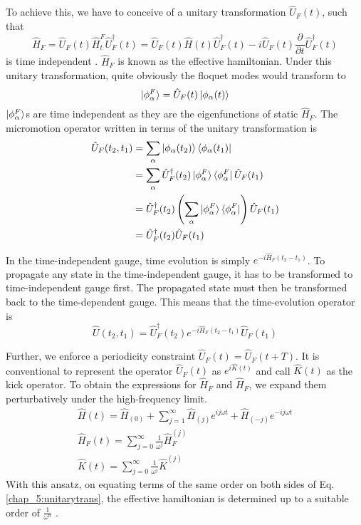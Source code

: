 To achieve this, we have to conceive of a unitary transformation $\hat{U}_{F}(t)$, such that 
\begin{equation}
 \label{chap_5:unitarytrans}\hat{H}_{F} = \hat{U}_{F}(t)\hat{H}_{t}^{F}\hat{U}_{F}^{\dagger}(t) = \hat{U}_{F}(t)\hat{H}(t)\hat{U}_{F}^{\dagger}(t) - i\hat{U}_{F}(t)\frac{\partial}{\partial t}\hat{U}_{F}^{\dagger}(t)
\end{equation} is time independent \cite{rahav2003effective, anisimovas2015high}. $\hat{H}_{F}$ is known as the effective hamiltonian. Under this unitary transformation, quite obviously the floquet modes would transform to
\begin{equation}
 \ket{\phi_\alpha^{F}} = \hat{U}_{F}(t)\ket{\phi_\alpha (t)}
\end{equation} $\ket{\phi_\alpha^{F}}$s are time independent as they are the eigenfunctions of static $\hat{H}_{F}$.
The micromotion operator written in terms of the unitary transformation is
\begin{align}
 \hat{U}_{F}(t_2, t_1) &= \sum_{\alpha}{\ket{\phi_\alpha (t_2)}\bra{\phi_\alpha (t_1)}} \nonumber \\
 &= \sum_{\alpha}{\hat{U}_{F}^{\dagger}(t_2)\ket{\phi_\alpha^{F}}\bra{\phi_\alpha^{F}}\hat{U}_{F}(t_1)} \nonumber \\
 &= \hat{U}_{F}^{\dagger}(t_2)\left(\sum_{\alpha}{\ket{\phi_\alpha^{F}}\bra{\phi_\alpha^{F}}}\right)\hat{U}_{F}(t_1) \nonumber \\
 &= \hat{U}_{F}^{\dagger}(t_2)\hat{U}_{F}(t_1)
\end{align}

In the time-independent gauge, time evolution is simply $e^{-i\hat{H}_{F}(t_2 - t_1)}$. To propagate any state in the time-independent gauge, it has to be transformed to 
time-independent gauge first. The propagated state must then be transformed back to the time-dependent gauge. This means that the time-evolution operator is
\begin{equation}
  \hat{U}(t_2, t_1) = \hat{U}_{F}^{\dagger}(t_2)e^{-i\hat{H}_{F}(t_2 - t_1)}\hat{U}_{F}(t_1)
\end{equation} 

Further, we enforce a periodicity constraint $\hat{U}_{F}(t) = \hat{U}_{F}(t+T)$. It is conventional to represent the operator $\hat{U}_{F}(t)$ as $e^{i\hat{K}(t)}$ and call $\hat{K}(t)$ as the kick operator.
To obtain the expressions for $\hat{H}_{F}$ and $\hat{H}_{F}$, we expand them perturbatively under the high-frequency limit.
\begin{gather}
 \hat{H}(t) = \hat{H}_{(0)} + \sum_{j=1}^{\infty}{\hat{H}_{(j)} e^{ij\omega t} + \hat{H}_{(-j)} e^{-ij\omega t}} \\
 \hat{H}_{F}(t) = \sum_{j=0}^{\infty}{\frac{1}{\omega^j}\hat{H}_{F}^{(j)}} \\
 \hat{K}(t) = \sum_{j=0}^{\infty}{\frac{1}{\omega^j}\hat{K}^{(j)}}
\end{gather}
With this ansatz, on equating terms of the same order on both sides of Eq. \eqref{chap_5:unitarytrans}, the effective hamiltonian is determined up to a suitable order of 
$\frac{1}{\omega^n}$ \cite{goldman2014periodically}.

